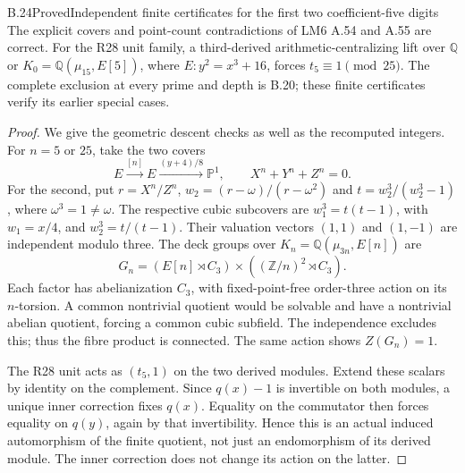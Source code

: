 \begin{statement}{B.24}{Proved}{Independent finite certificates for the first two coefficient-five digits}
The explicit covers and point-count contradictions of LM6
A.54 and A.55 are correct. For the R28 unit family, a
third-derived arithmetic-centralizing lift over $\mathbb Q$
or $K_0=\mathbb Q(\mu_{15},E[5])$, where
$E:y^2=x^3+16$, forces $t_5\equiv1\pmod{25}$.
The complete exclusion at every prime and depth is B.20;
these finite certificates verify its earlier special cases.
\end{statement}
\begin{proof}
We give the geometric descent checks as well as the recomputed
integers. For $n=5$ or $25$, take the two covers
\[
 E\xrightarrow{[n]}E\xrightarrow{(y+4)/8}\mathbb P^1,
 \qquad X^n+Y^n+Z^n=0.
\]
For the second, put $r=X^n/Z^n$,
$w_2=(r-\omega)/(r-\omega^2)$ and
$t=w_2^3/(w_2^3-1)$, where $\omega^3=1\ne\omega$.
The respective cubic subcovers are
$w_1^3=t(t-1)$, with $w_1=x/4$, and $w_2^3=t/(t-1)$.
Their valuation vectors $(1,1)$ and $(1,-1)$ are independent
modulo three. The deck groups over
$K_n=\mathbb Q(\mu_{3n},E[n])$ are
\[
 G_n=(E[n]\rtimes C_3)\times((\mathbb Z/n)^2\rtimes C_3).
\]
Each factor has abelianization $C_3$, with fixed-point-free
order-three action on its $n$-torsion. A common nontrivial
quotient would be solvable and have a nontrivial abelian quotient,
forcing a common cubic subfield. The independence excludes this;
thus the fibre product is connected. The same action shows
$Z(G_n)=1$.

The R28 unit acts as $(t_5,1)$ on the two derived modules.
Extend these scalars by identity on the complement. Since
$q(x)-1$ is invertible on both modules, a unique inner correction
fixes $q(x)$. Equality on the commutator then forces equality
on $q(y)$, again by that invertibility. Hence this is an actual
induced automorphism of the finite quotient, not just an
endomorphism of its derived module. The inner correction does
not change its action on the latter.


\end{proof}
